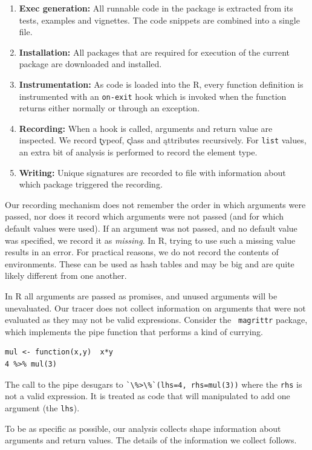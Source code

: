 \documentclass[acmsmall,10pt,review,anonymous]{acmart}\settopmatter{printfolios=true,printccs=false,printacmref=false}
\newcommand{\code}[1]{\lstinline|#1|\xspace}
\begin{document}
\begin{enumerate}
\item {\bf Exec generation:} All runnable code in the package is extracted
  from its tests, examples and vignettes. The code snippets are combined
  into a single file.
\item {\bf Installation:} All packages that are required for execution of
  the current package are downloaded and installed.
\item {\bf Instrumentation:} As code is loaded into the R, every function
  definition is instrumented with an \code{on-exit} hook which is invoked
  when the function returns either normally or through an exception.
\item {\bf Recording:} When a hook is called, arguments and return value are
  inspected. We record \k{typeof}, \k{class} and \k{attributes} recursively.
  For \code{list} values, an extra bit of analysis is performed to record
  the element type.
\item {\bf Writing:} Unique signatures are recorded to file with information
  about which package triggered the recording.
\end{enumerate}

Our recording mechanism does not remember the order in which arguments were
passed, nor does it record which arguments were not passed (and for which
default values were used). If an argument was not passed, and no default
value was specified, we record it as \emph{missing}. In R, trying to use
such a missing value results in an error. For practical reasons, we do not
record the contents of environments. These can be used as hash tables and
may be big and are quite likely different from one another.

In R all arguments are passed as promises, and unused arguments will be
unevaluated.  Our tracer does not collect information on arguments that were
not evaluated as they may not be valid expressions.  Consider the {\tt
  magrittr} package, which implements the pipe function that performs a kind
of currying.

{\small\begin{lstlisting}[style=R]
mul <- function(x,y)  x*y
4 %>% mul(3)
\end{lstlisting}}

The call to the pipe desugars to \code{`\%>\%`(lhs=4, rhs=mul(3))} where the
\code{rhs} is not a valid expression. It is treated as code that will
manipulated to add one argument (the \code{lhs}).

To be as specific as possible, our analysis collects shape information about
arguments and return values. The details of the information we collect follows.
\end{document}
